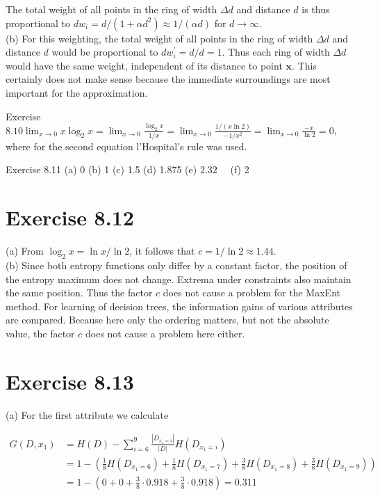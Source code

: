 \documentclass[10pt]{article}
\begin{document}
The total weight of all points in the ring of width $\Delta d$ and distance $d$ is thus proportional to $d w_{i}=d /\left(1+\alpha d^{2}\right) \approx 1 /(\alpha d)$ for $d \rightarrow \infty$.\\
(b) For this weighting, the total weight of all points in the ring of width $\Delta d$ and distance $d$ would be proportional to $d w_{i}^{\prime}=d / d=1$. Thus each ring of width $\Delta d$ would have the same weight, independent of its distance to point $\boldsymbol{x}$. This certainly does not make sense because the immediate surroundings are most important for the approximation.

Exercise $8.10 \lim _{x \rightarrow 0} x \log _{2} x=\lim _{x \rightarrow 0} \frac{\log _{2} x}{1 / x}=\lim _{x \rightarrow 0} \frac{1 /(x \ln 2)}{-1 / x^{2}}=\lim _{x \rightarrow 0} \frac{-x}{\ln 2}=0$, where for the second equation l'Hospital's rule was used.

Exercise 8.11 (a) 0 (b) 1 (c) 1.5 (d) 1.875 (e) $2.32 \quad$ (f) 2

\section*{Exercise 8.12}
(a) From $\log _{2} x=\ln x / \ln 2$, it follows that $c=1 / \ln 2 \approx 1.44$.\\
(b) Since both entropy functions only differ by a constant factor, the position of the entropy maximum does not change. Extrema under constraints also maintain the same position. Thus the factor $c$ does not cause a problem for the MaxEnt method. For learning of decision trees, the information gains of various attributes are compared. Because here only the ordering matters, but not the absolute value, the factor $c$ does not cause a problem here either.

\section*{Exercise 8.13}
(a) For the first attribute we calculate

$$
\begin{aligned}
G\left(D, x_{1}\right) & =H(D)-\sum_{i=6}^{9} \frac{\left|D_{x_{1}=i}\right|}{|D|} H\left(D_{x_{1}=i}\right) \\
& =1-\left(\frac{1}{8} H\left(D_{x_{1}=6}\right)+\frac{1}{8} H\left(D_{x_{1}=7}\right)+\frac{3}{8} H\left(D_{x_{1}=8}\right)+\frac{3}{8} H\left(D_{x_{1}=9}\right)\right) \\
& =1-\left(0+0+\frac{3}{8} \cdot 0.918+\frac{3}{8} \cdot 0.918\right)=0.311
\end{aligned}
$$
\end{document}
